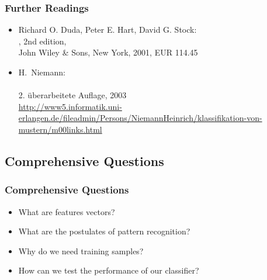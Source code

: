    \begin{frame}
      \frametitle{Further Readings}

      \begin{itemize}
         \item Richard O. Duda, Peter E. Hart, David G. Stock: \\
           , 2nd edition, \\
           John Wiley \& Sons, New York, 2001, EUR 114.45 \\[.5cm]
         \item H.\ Niemann: \\
            \\
           2. \"{u}berarbeitete Auflage, 2003 \\
           {\small \url{http://www5.informatik.uni-erlangen.de/fileadmin/Persons/NiemannHeinrich/klassifikation-von-mustern/m00links.html}}
      \end{itemize}
   \end{frame}
\fi

\subsection{Comprehensive Questions}

\begin{frame}
   \frametitle{Comprehensive Questions}

   \begin{itemize}
      \item What are features vectors? \\[.7cm] \pause
      \item What are the postulates of pattern recognition? \\[.7cm] \pause
      \item Why do we need training samples? \\[.7cm] \pause
      \item How can we test the performance of our classifier?
   \end{itemize}
\end{frame}


